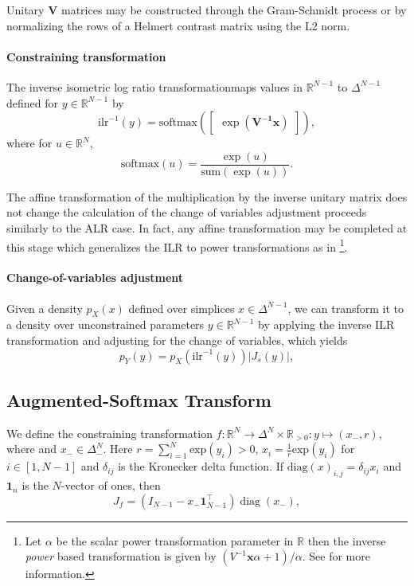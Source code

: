 \documentclass[11pt]{article}
\newcommand{\abs}[1]{\left| #1 \right|}
\newcommand{\absdet}[1]{\abs{#1}}
\begin{document}
Unitary $\mathbf{V}$ matrices may be constructed through the Gram-Schmidt process or by normalizing the rows of a Helmert contrast matrix using the L2 norm.

\paragraph{Constraining transformation}
The inverse isometric log ratio transformationmaps values in
$\mathbb{R}^{N-1}$ to $\Delta^{N-1}$ defined for $y \in
\mathbb{R}^{N-1}$ by
\[
  \textrm{ilr}^{-1}(y)
  = \textrm{softmax}(\begin{bmatrix} \exp(\mathbf{V^{-1}} \mathbf{x} ) \end{bmatrix}),
\]
where for $u \in \mathbb{R}^N$,
\[
  \textrm{softmax}(u) = \frac{\exp(u)}{\textrm{sum}(\exp(u))}.
\]

The affine transformation of the multiplication by the inverse unitary matrix does not change
the calculation of the change of variables adjustment proceeds similarly to the ALR case. In fact, any affine transformation may be completed at this stage which generalizes the ILR to power transformations as in \cite{tsagris2011data}\footnote{
   Let $\alpha$ be the scalar power transformation parameter in $\mathbb{R}$ then the inverse \textit{power} based transformation is given by $(V^{-1} \mathbf{x} \alpha + 1) / \alpha$. See \cite{tsagris2011data} for more information.
}. 
\paragraph{Change-of-variables adjustment}
Given a density $p_X(x)$ defined over simplices $x \in \Delta^{N-1}$,
we can transform it to a density over unconstrained parameters $y \in
\mathbb{R}^{N-1}$ by applying the inverse ILR transformation and adjusting
for the change of variables, which yields
\[
  p_Y(y) = p_X(\textrm{ilr}^{-1}(y)) \absdet{J_{s}(y)},
\]


\subsection{Augmented-Softmax Transform}
We define the constraining transformation
$f: \mathbb{R}^N \to \Delta^{N} \times \mathbb{R}_{>0}: y \mapsto
(x_-, r)$, where and $x_{-} \in \Delta_{-}^N$. Here $r = \sum_{i=1}^N \textrm{exp}(y_i) > 0$,
$x_i = \frac{1}{r} \textrm{exp}(y_i)$ for $i \in [1, N-1]$ and $\delta_{ij}$ is the Kronecker delta function. If $\mathrm{diag}(x)_{i, j} = \delta_{ij} x_i$ and $\boldsymbol{1}_n$ is the $N$-vector of ones, then
\[
  J_f = (I_{N-1} - x_- \boldsymbol{1}_{N-1}^\top) \operatorname{diag}(x_-),
\] 
\end{document}
